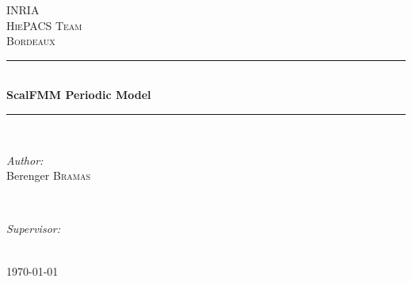 \documentclass[12pt]{article} %
\begin{document}

\begin{titlepage}

\newcommand{\HRule}{\rule{\linewidth}{0.5mm}} %

\center %

\textsc{\LARGE INRIA}\\[1.5cm] %
\textsc{\Large HiePACS Team}\\[0.5cm] %
\textsc{\large Bordeaux}\\[0.5cm] %

\HRule \\[0.4cm]
{ \huge \bfseries ScalFMM Periodic Model}\\[0.4cm] %
\HRule \\[1.5cm]

\begin{minipage}{0.4\textwidth}
\begin{flushleft} \large
\emph{Author:}\\
Berenger \textsc{Bramas} %
\end{flushleft}
\end{minipage}
~
\begin{minipage}{0.4\textwidth}
\begin{flushright} \large
\emph{Supervisor:} \\
\textsc{} %
\end{flushright}
\end{minipage}\\[4cm]

{\large \today}\\[3cm] %

\vfill %

\end{titlepage}


\tableofcontents %
\end{document}
